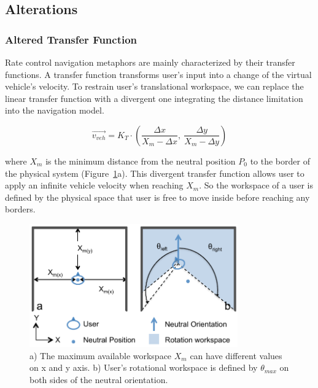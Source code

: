 \subsection{Alterations}

\subsubsection{Altered Transfer Function}
\label{sec:altered_tf}
Rate control navigation metaphors are mainly characterized by their transfer functions. A transfer function transforms user's input into a change of the virtual vehicle's velocity. To restrain user's translational workspace, we can replace the linear transfer function with a divergent one integrating the distance limitation into the navigation model.

\begin{equation}
\overrightarrow{v_{veh}}=K_{T}\cdot \left(\frac{\Delta x}{X_{m}-\Delta x},\:\frac{\Delta y}{X_{m}-\Delta y}\right)
\end{equation}

where $X_{m}$ is the minimum distance from the neutral position $P_{0}$ to the border of the physical system (Figure~\ref{fig:4_workspace_border}a). This divergent transfer function allows user to apply an infinite vehicle velocity when reaching $X_{m}$. So the workspace of a user is defined by the physical space that user is free to move inside before reaching any borders.

\begin{figure}[htb]
\begin{center}
\includegraphics[width=0.8\textwidth]{figures/ch4/workspace_border}
\par\end{center}
\caption{\label{fig:4_workspace_border}a) The maximum available workspace $X_{m}$ can have different values on x and y axis. b) User's rotational workspace is defined by $\theta_{max}$ on both sides of the neutral orientation.}
\end{figure}

